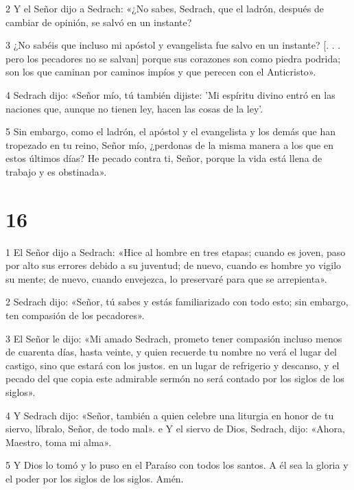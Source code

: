 \par 2 Y el Señor dijo a Sedrach: «¿No sabes, Sedrach, que el ladrón, después de cambiar de opinión, se salvó en un instante?

\par 3 ¿No sabéis que incluso mi apóstol y evangelista fue salvo en un instante? [. . . pero los pecadores no se salvan] porque sus corazones son como piedra podrida; son los que caminan por caminos impíos y que perecen con el Anticristo».

\par 4 Sedrach dijo: «Señor mío, tú también dijiste: 'Mi espíritu divino entró en las naciones que, aunque no tienen ley, hacen las cosas de la ley'.

\par 5 Sin embargo, como el ladrón, el apóstol y el evangelista y los demás que han tropezado en tu reino, Señor mío, ¿perdonas de la misma manera a los que en estos últimos días? He pecado contra ti, Señor, porque la vida está llena de trabajo y es obstinada».

\chapter{16}

\par 1 El Señor dijo a Sedrach: «Hice al hombre en tres etapas; cuando es joven, paso por alto sus errores debido a su juventud; de nuevo, cuando es hombre yo vigilo su mente; de nuevo, cuando envejezca, lo preservaré para que se arrepienta».

\par 2 Sedrach dijo: «Señor, tú sabes y estás familiarizado con todo esto; sin embargo, ten compasión de los pecadores».

\par 3 El Señor le dijo: «Mi amado Sedrach, prometo tener compasión incluso menos de cuarenta días, hasta veinte, y quien recuerde tu nombre no verá el lugar del castigo, sino que estará con los justos. en un lugar de refrigerio y descanso, y el pecado del que copia este admirable sermón no será contado por los siglos de los siglos».

\par 4 Y Sedrach dijo: «Señor, también a quien celebre una liturgia en honor de tu siervo, líbralo, Señor, de todo mal». e Y el siervo de Dios, Sedrach, dijo: «Ahora, Maestro, toma mi alma».

\par 5 Y Dios lo tomó y lo puso en el Paraíso con todos los santos. A él sea la gloria y el poder por los siglos de los siglos. Amén.




